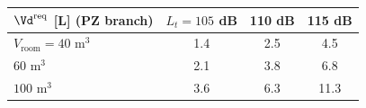 \begin{center}
\begin{tabular}{lccc}
\toprule
$\Vd^{\mathrm{req}}$ [L] (PZ branch) & $L_t=105$ dB & 110 dB & 115 dB\\
\midrule
$V_{\mathrm{room}}=40$ m$^3$ & 1.4 & 2.5 & 4.5\\
$60$ m$^3$ & 2.1 & 3.8 & 6.8\\
$100$ m$^3$ & 3.6 & 6.3 & 11.3\\
\bottomrule
\end{tabular}
\end{center}
